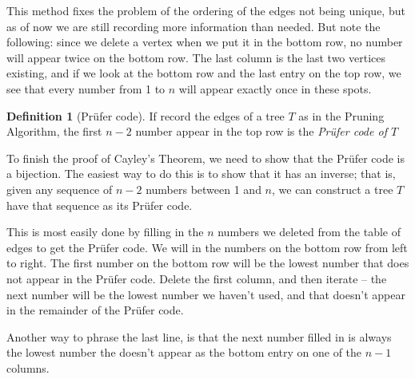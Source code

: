 \documentclass[10pt,]{book}
\theoremstyle{plain}
\theoremstyle{definition}
\newtheorem{definition}[theorem]{Definition}
\theoremstyle{definition}
\theoremstyle{definition}
\theoremstyle{definition}
\numberwithin{equation}{section}
\begin{document}
\hypertarget{p-242}{}%
This method fixes the problem of the ordering of the edges not being unique, but as of now we are still recording more information than needed.  But note the following: since we delete a vertex when we put it in the bottom row, no number will appear twice on the bottom row.  The last column is the last two vertices existing, and if we look at the bottom row and the last entry on the top row, we see that every number from 1 to \(n\) will appear exactly once in these spots.%
\begin{definition}[{Prüfer code}]\label{definition-19}
\hypertarget{p-243}{}%
If record the edges of a tree \(T\) as in the Pruning Algorithm, the first \(n-2\) number appear in the top row is the \emph{Prüfer code of \(T\)}%
\end{definition}
\hypertarget{p-244}{}%
To finish the proof of Cayley's Theorem, we need to show that the Prüfer code is a bijection.  The easiest way to do this is to show that it has an inverse; that is, given any sequence of \(n-2\) numbers between 1 and \(n\), we can construct a tree \(T\) have that sequence as its Prüfer code.%
\par
\hypertarget{p-245}{}%
This is most easily done by filling in the \(n\) numbers we deleted from the table of edges to get the Prüfer code.  We will in the numbers on the bottom row from left to right.  The first number on the bottom row will be the lowest number that does not appear in the Prüfer code.  Delete the first column, and then iterate -- the next number will be the lowest number we haven't used, and that doesn't appear in the remainder of the Prüfer code.%
\par
\hypertarget{p-246}{}%
Another way to phrase the last line, is that the next number filled in is always the lowest number the doesn't appear as the bottom entry on one of the \(n-1\) columns.%
\end{document}
